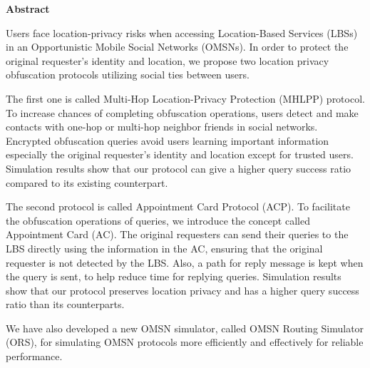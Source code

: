 
\begin{center}\textbf{Abstract}\end{center}

\noindent Users face location-privacy risks when accessing Location-Based Services (LBSs) in an Opportunistic Mobile Social Networks (OMSNs). In order to protect the original requester's identity and location, we propose two location privacy obfuscation protocols utilizing social ties between users.

The first one is called Multi-Hop Location-Privacy Protection (MHLPP) protocol. To increase chances of completing obfuscation operations, users detect and make contacts with one-hop or multi-hop neighbor friends in social networks. Encrypted obfuscation queries avoid users learning important information especially the original requester's identity and location except for trusted users. Simulation results show that our protocol can give a higher query success ratio compared to its existing counterpart. 

The second protocol is called Appointment Card Protocol (ACP). To facilitate the obfuscation operations of queries, we introduce the concept called Appointment Card (AC). The original requesters can send their queries to the LBS directly using the information in the AC, ensuring that the original requester is not detected by the LBS. Also, a path for reply message is kept when the query is sent, to help reduce time for replying queries. Simulation results show that our protocol preserves location privacy and has a higher query success ratio than its counterparts.

We have also developed a new OMSN simulator, called OMSN Routing Simulator (ORS), for simulating OMSN protocols more efficiently and effectively for reliable performance.

\cleardoublepage
